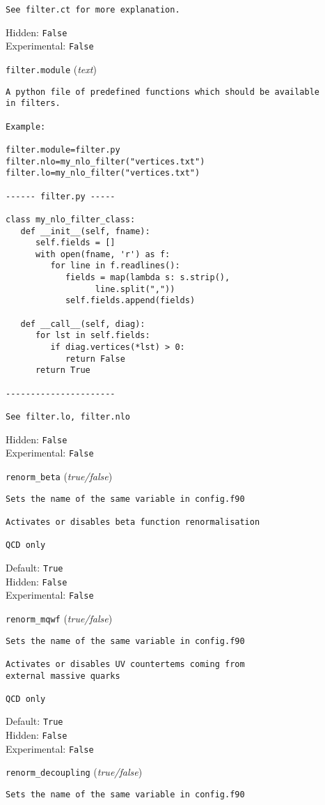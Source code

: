 \begin{basedescript}{\desclabelstyle{\pushlabel}}
\begin{verbatim}
See filter.ct for more explanation.
\end{verbatim}
Hidden: \verb|False|
\\Experimental: \verb|False|
\\\item[\colorbox{gray!30}{\texttt{filter.module}}] (\textit{text})
\begin{verbatim}
A python file of predefined functions which should be available
in filters.

Example:

filter.module=filter.py
filter.nlo=my_nlo_filter("vertices.txt")
filter.lo=my_nlo_filter("vertices.txt")

------ filter.py -----

class my_nlo_filter_class:
   def __init__(self, fname):
      self.fields = []
      with open(fname, 'r') as f:
         for line in f.readlines():
            fields = map(lambda s: s.strip(),
                  line.split(","))
            self.fields.append(fields)

   def __call__(self, diag):
      for lst in self.fields:
         if diag.vertices(*lst) > 0:
            return False
      return True

----------------------

See filter.lo, filter.nlo
\end{verbatim}
Hidden: \verb|False|
\\Experimental: \verb|False|
\\\item[\colorbox{gray!30}{\texttt{renorm\_beta}}] (\textit{true/false})
\begin{verbatim}
Sets the name of the same variable in config.f90

Activates or disables beta function renormalisation

QCD only
\end{verbatim}
Default: \verb|True|
\\Hidden: \verb|False|
\\Experimental: \verb|False|
\\\item[\colorbox{gray!30}{\texttt{renorm\_mqwf}}] (\textit{true/false})
\begin{verbatim}
Sets the name of the same variable in config.f90

Activates or disables UV countertems coming from
external massive quarks

QCD only
\end{verbatim}
Default: \verb|True|
\\Hidden: \verb|False|
\\Experimental: \verb|False|
\\\item[\colorbox{gray!30}{\texttt{renorm\_decoupling}}] (\textit{true/false})
\begin{verbatim}
Sets the name of the same variable in config.f90


\end{verbatim}
\end{basedescript}
